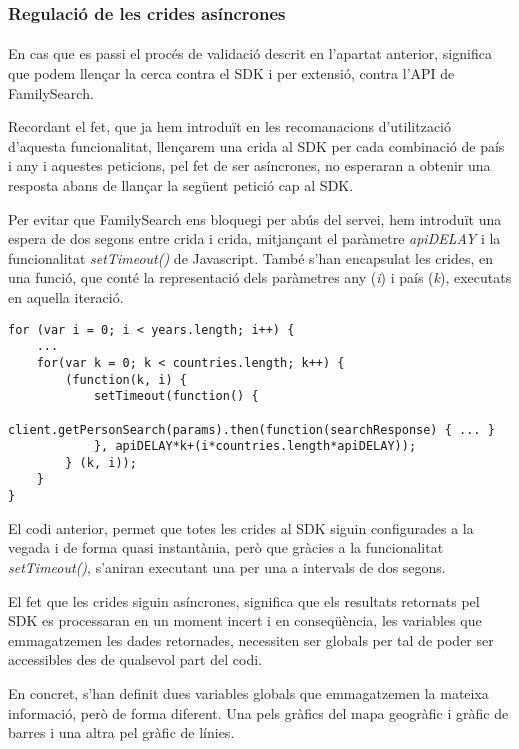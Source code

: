 \subsubsection{Regulació de les crides asíncrones}

\paragraph{}
En cas que es passi el procés de validació descrit en l'apartat anterior, significa que podem llençar la cerca contra el SDK i per extensió, contra l’API de FamilySearch.

Recordant el fet, que ja hem introduït en les recomanacions d’utilització d’aquesta funcionalitat, llençarem una crida al SDK per cada combinació de país i any i aquestes peticions, pel fet de ser asíncrones, no esperaran a obtenir una resposta abans de llançar la següent petició cap al SDK.

Per evitar que FamilySearch ens bloquegi per abús del servei, hem introduït una espera de dos segons entre crida i crida, mitjançant el paràmetre \emph{apiDELAY} i la funcionalitat \emph{setTimeout()} de Javascript. També s'han encapsulat les crides, en una funció, que conté la representació dels paràmetres any (\emph{i}) i país (\emph{k}), executats en aquella iteració.

\begin{lstlisting}[style=rawOwn,caption={Separació manual de les crides asíncrones al SDK}]
for (var i = 0; i < years.length; i++) {
    ...
    for(var k = 0; k < countries.length; k++) {
        (function(k, i) {
            setTimeout(function() {
                client.getPersonSearch(params).then(function(searchResponse) { ... }
            }, apiDELAY*k+(i*countries.length*apiDELAY));
        } (k, i));
    }
}
\end{lstlisting}

El codi anterior, permet que totes les crides al SDK siguin configurades a la vegada i de forma quasi instantània, però que gràcies a la funcionalitat \emph{setTimeout()}, s'aniran executant una per una a intervals de dos segons.

El fet que les crides siguin asíncrones, significa que els resultats retornats pel SDK es processaran en un moment incert i en conseqüència, les variables que emmagatzemen les dades retornades, necessiten ser globals per tal de poder ser accessibles des de qualsevol part del codi.

En concret, s'han definit dues variables globals que emmagatzemen la mateixa informació, però de forma diferent. Una pels gràfics del mapa geogràfic i gràfic de barres i una altra pel gràfic de línies.


